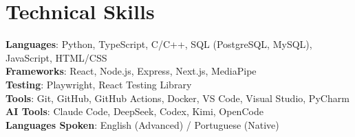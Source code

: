 \documentclass[letterpaper,11pt]{article}
\begin{document}
\section{Technical Skills}
 \begin{itemize}[leftmargin=0.15in, label={}]
    \small{\item{
     \textbf{Languages}{: Python, TypeScript, C/C++, SQL (PostgreSQL, MySQL), JavaScript, HTML/CSS} \\
     \textbf{Frameworks}{: React, Node.js, Express, Next.js, MediaPipe} \\
     \textbf{Testing}{: Playwright, React Testing Library} \\
     \textbf{Tools}{: Git, GitHub, GitHub Actions, Docker, VS Code, Visual Studio, PyCharm} \\
     \textbf{AI Tools}{: Claude Code, DeepSeek, Codex, Kimi, OpenCode} \\
     \textbf{Languages Spoken}{: English (Advanced) / Portuguese (Native)}
    }}
 \end{itemize}

\end{document}
